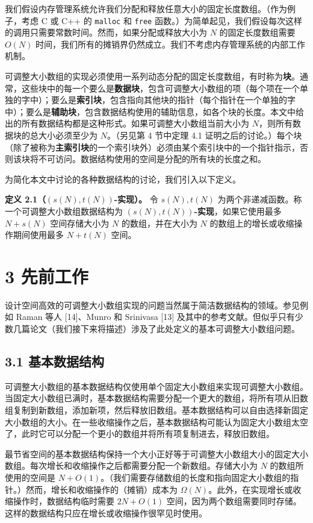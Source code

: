 \documentclass[12pt,a4paper]{ctexart}
\theoremstyle{remark}
\begin{document}
我们假设内存管理系统允许我们分配和释放任意大小的固定长度数组。（作为例子，考虑 C 或 C++ 的 \texttt{malloc} 和 \texttt{free} 函数。）为简单起见，我们假设每次这样的调用只需要常数时间。然而，如果分配或释放大小为 $N$ 的固定长度数组需要 $O(N)$ 时间，我们所有的摊销界仍然成立。我们不考虑内存管理系统的内部工作机制。

可调整大小数组的实现必须使用一系列动态分配的固定长度数组，有时称为\textbf{块}。通常，这些块中的每一个要么是\textbf{数据块}，包含可调整大小数组的项（每个项在一个单独的字中）；要么是\textbf{索引块}，包含指向其他块的指针（每个指针在一个单独的字中）；要么是\textbf{辅助块}，包含数据结构使用的辅助信息，如各个块的长度。本文中给出的所有数据结构都是这种形式。如果可调整大小数组当前大小为 $N$，则所有数据块的总大小必须至少为 $N$。（另见第 4 节中定理 4.1 证明之后的讨论。）每个块（除了被称为\textbf{主索引块}的一个索引块外）必须由某个索引块中的一个指针指示，否则该块将不可访问。数据结构使用的空间是分配的所有块的长度之和。

为简化本文中讨论的各种数据结构的讨论，我们引入以下定义。

\textbf{定义 2.1（$(s(N),t(N))$-实现）。} 令 $s(N),t(N)$ 为两个非递减函数。称一个可调整大小数组数据结构为 $(s(N),t(N))$\textbf{-实现}，如果它使用最多 $N+s(N)$ 空间存储大小为 $N$ 的数组，并在大小为 $N$ 的数组上的增长或收缩操作期间使用最多 $N+t(N)$ 空间。

\section{3 先前工作}

设计空间高效的可调整大小数组实现的问题当然属于简洁数据结构的领域。参见例如 Raman 等人 [14]、Munro 和 Srinivasa [13] 及其中的参考文献。但似乎只有少数几篇论文（我们接下来将描述）涉及了此处定义的基本可调整大小数组问题。

\subsection{3.1 基本数据结构}

可调整大小数组的基本数据结构仅使用单个固定大小数组来实现可调整大小数组。当固定大小数组已满时，基本数据结构需要分配一个更大的数组，将所有项从旧数组复制到新数组，添加新项，然后释放旧数组。基本数据结构可以自由选择新固定大小数组的大小。在一些收缩操作之后，基本数据结构可能认为固定大小数组太空了，此时它可以分配一个更小的数组并将所有项复制进去，释放旧数组。

最节省空间的基本数据结构保持一个大小正好等于可调整大小数组大小的固定大小数组。每次增长和收缩操作之后都需要分配一个新数组。存储大小为 $N$ 的数组所使用的空间是 $N+O(1)$。（我们需要存储数组的长度和指向固定大小数组的指针。）然而，增长和收缩操作的（摊销）成本为 $\Omega(N)$。此外，在实现增长或收缩操作时，数据结构临时需要 $2N+O(1)$ 空间，因为两个数组需要同时存储。这样的数据结构只应在增长或收缩操作很罕见时使用。
\end{document}
